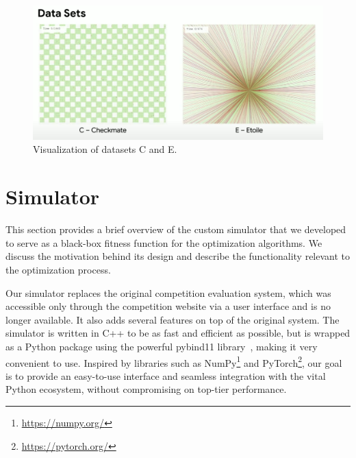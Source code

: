\begin{figure}[h]
    \centering
    \includegraphics[width=\linewidth]{img/screenshots/hashcode_datasets_c_e.png}
    \caption[Visualization of datasets C and E]{
        Visualization of datasets C and E\protect\footnotemark.
    }
    \label{fig:hashcode_dataset_c_e}
    \end{figure}



\section{Simulator} \label{sec:simulator}

This section provides a brief overview of the custom simulator that we developed to serve as a black-box fitness function for the optimization algorithms. We discuss the motivation behind its design and describe the functionality relevant to the optimization process.

\bigskip

Our simulator replaces the original competition evaluation system, which was accessible only through the competition website via a user interface and is no longer available. It also adds several features on top of the original system.
The simulator is written in C++ to be as fast and efficient as possible, but is wrapped as a Python package using the powerful pybind11 library~\cite{jakob2017pybind11}, making it very convenient to use.
Inspired by libraries such as NumPy\footnote{\url{https://numpy.org/}} and PyTorch\footnote{\url{https://pytorch.org/}}, our goal is to provide an easy-to-use interface and seamless integration with the vital Python ecosystem, without compromising on top-tier performance.

